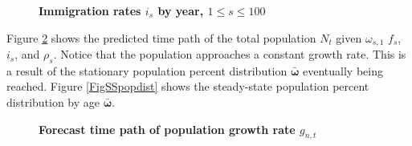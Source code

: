 \documentclass[12pt]{report}
\theoremstyle{definition}
\begin{document}
  \begin{figure}[htbp]\centering \captionsetup{width=4.0in}
    \caption{\label{FigImmigRates}\textbf{Immigration rates $i_s$ by year, $1\leq s\leq 100$}}
  \end{figure}

  Figure \ref{FigPopPath} shows the predicted time path of the total population $N_t$ given $\omega_{s,1}$ $f_s$, $i_s$, and $\rho_s$. Notice that the population approaches a constant growth rate. This is a result of the stationary population percent distribution $\bm{\bar{\omega}}$ eventually being reached. Figure \ref{FigSSpopdist} shows the steady-state population percent distribution by age $\bm{\bar{\omega}}$.

  \begin{figure}[htbp]\centering \captionsetup{width=4.0in}
    \caption{\label{FigPopPath}\textbf{Forecast time path of population growth rate $g_{n,t}$}}
  \end{figure}
\end{document}
